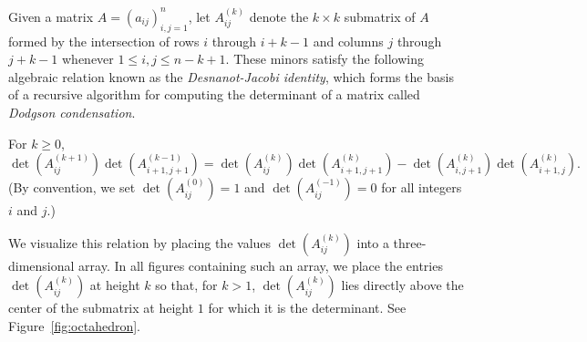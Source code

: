 Given a matrix $A=(a_{ij})_{i,j=1}^{n}$, let $A_{ij}^{(k)}$ denote the $k \times k$ submatrix of $A$ formed by the intersection of rows $i$ through $i+k-1$ and columns $j$ through $j+k-1$ whenever $1 \leq i,j \leq n-k+1$. These minors satisfy the following algebraic relation known as the \emph{Desnanot-Jacobi identity}, which forms the basis of a recursive algorithm for computing the determinant of a matrix called \emph{Dodgson condensation}.

\begin{Prop} \label{prop:dodgson}
For $k \geq 0$,
\[\det(A_{ij}^{(k+1)}) \det(A_{i+1,j+1}^{(k-1)})=\det(A_{ij}^{(k)})\det(A_{i+1,j+1}^{(k)})-\det(A_{i,j+1}^{(k)})\det(A_{i+1,j}^{(k)}).\]
(By convention, we set $\det(A_{ij}^{(0)})=1$ and $\det(A_{ij}^{(-1)})=0$ for all integers $i$ and $j$.)
\end{Prop}

We visualize this relation by placing the values $\det(A_{ij}^{(k)})$ into a three-dimensional array. In all figures containing such an array, we place the entries $\det(A_{ij}^{(k)})$ at height $k$ so that, for $k>1$, $\det(A_{ij}^{(k)})$ lies directly above the center of the submatrix at height $1$ for which it is the determinant. See Figure~\ref{fig:octahedron}.










